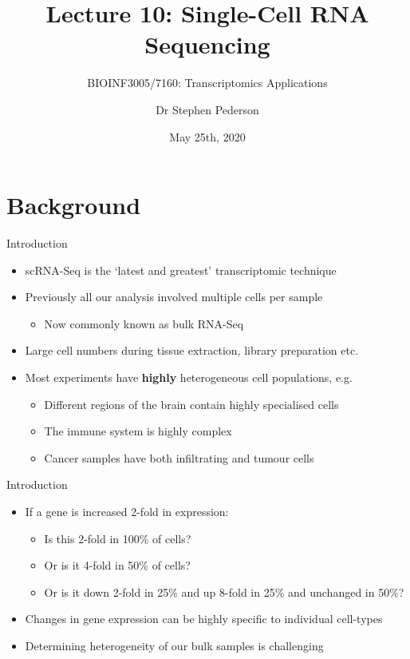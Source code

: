 \documentclass[aspectratio=169,11pt]{beamer}
\author{Dr Stephen Pederson}
\title{Lecture 10: Single-Cell RNA Sequencing}
\subtitle{BIOINF3005/7160: Transcriptomics Applications}
\institute{Bioinformatics Hub, \\The University of Adelaide}
\date{May 25th, 2020}
\begin{document}
\begin{frame}
\titlepage
\end{frame}

\begin{frame}
\footnotesize
\tableofcontents
\end{frame}


\section{Background}

\begin{frame}{Introduction}

	\begin{itemize}
		\item scRNA-Seq is the `latest and greatest' transcriptomic technique
		\item Previously all our analysis involved multiple cells per sample
		\begin{itemize}
			\item Now commonly known as bulk RNA-Seq
		\end{itemize}
		\item Large cell numbers during tissue extraction, library preparation etc.
		\item Most experiments have \textbf{highly} heterogeneous cell populations, e.g.
		\pause
		\begin{itemize}
			\item Different regions of the brain contain highly specialised cells
			\item The immune system is highly complex
			\item Cancer samples have both infiltrating and tumour cells
		\end{itemize}
	\end{itemize}


\end{frame}

\begin{frame}{Introduction}

	\begin{itemize}
		\item If a gene is increased 2-fold in expression:
		\begin{itemize}
			\item Is this 2-fold in 100\% of cells?
			\item Or is it 4-fold in 50\% of cells?
			\item Or is it down 2-fold in 25\% and up 8-fold in 25\% and unchanged in 50\%?
		\end{itemize}
		\item Changes in gene expression can be highly specific to individual cell-types
		\item Determining heterogeneity of our bulk samples is challenging
	\end{itemize}

\end{frame}
\end{document}
